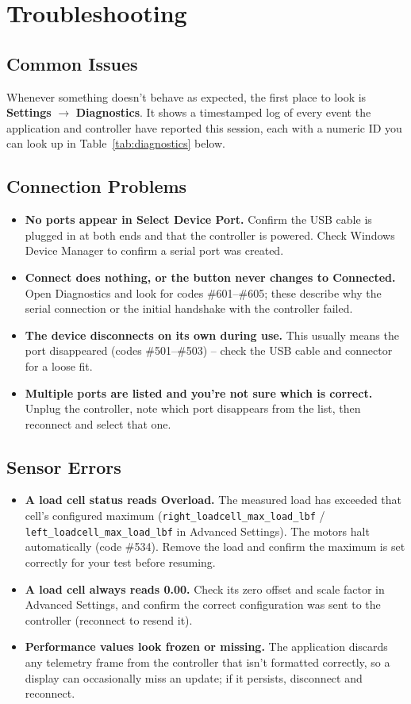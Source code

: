 \documentclass[12pt]{report}
\begin{document}
\chapter{Troubleshooting}
\label{ch:troubleshooting}

\section{Common Issues}
Whenever something doesn't behave as expected, the first place to look is \textbf{Settings} $\rightarrow$ \textbf{Diagnostics}. It shows a timestamped log of every event the application and controller have reported this session, each with a numeric ID you can look up in Table~\ref{tab:diagnostics} below.

\section{Connection Problems}
\begin{itemize}
    \item \textbf{No ports appear in Select Device Port.} Confirm the USB cable is plugged in at both ends and that the controller is powered. Check Windows Device Manager to confirm a serial port was created.
    \item \textbf{Connect does nothing, or the button never changes to Connected.} Open Diagnostics and look for codes \#601--\#605; these describe why the serial connection or the initial handshake with the controller failed.
    \item \textbf{The device disconnects on its own during use.} This usually means the port disappeared (codes \#501--\#503) -- check the USB cable and connector for a loose fit.
    \item \textbf{Multiple ports are listed and you're not sure which is correct.} Unplug the controller, note which port disappears from the list, then reconnect and select that one.
\end{itemize}

\section{Sensor Errors}
\begin{itemize}
    \item \textbf{A load cell status reads Overload.} The measured load has exceeded that cell's configured maximum (\texttt{right\_loadcell\_max\_load\_lbf} / \texttt{left\_loadcell\_max\_load\_lbf} in Advanced Settings). The motors halt automatically (code \#534). Remove the load and confirm the maximum is set correctly for your test before resuming.
    \item \textbf{A load cell always reads 0.00.} Check its zero offset and scale factor in Advanced Settings, and confirm the correct configuration was sent to the controller (reconnect to resend it).
    \item \textbf{Performance values look frozen or missing.} The application discards any telemetry frame from the controller that isn't formatted correctly, so a display can occasionally miss an update; if it persists, disconnect and reconnect.
\end{itemize}
\end{document}
